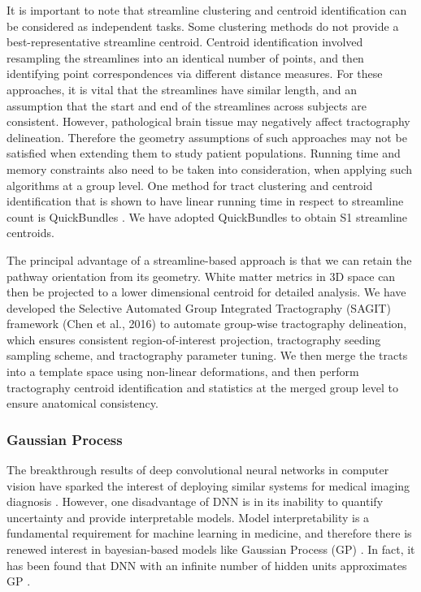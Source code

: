 It is important to note that streamline clustering and centroid identification can be considered as independent tasks. Some clustering methods do not provide a best-representative streamline centroid. Centroid identification involved resampling the streamlines into an identical number of points, and then identifying point correspondences via different distance measures. For these approaches, it is vital that the streamlines have similar length, and an assumption that the start and end of the streamlines across subjects are consistent. However, pathological brain tissue may negatively affect tractography delineation. Therefore the geometry assumptions of such approaches may not be satisfied when extending them to study patient populations. Running time and memory constraints also need to be taken into consideration, when applying such algorithms at a group level. One method for tract clustering and centroid identification that is shown to have linear running time in respect to streamline count is QuickBundles \cite{Garyfallidis2012}. We have adopted QuickBundles to obtain S1 streamline centroids. 

The principal advantage of a streamline-based approach is that we can retain the pathway orientation from its geometry. White matter metrics in 3D space can then be projected to a lower dimensional centroid for detailed analysis. We have developed the Selective Automated Group Integrated Tractography (SAGIT) framework (Chen et al., 2016) to automate group-wise tractography delineation, which ensures consistent region-of-interest projection, tractography seeding sampling scheme, and tractography parameter tuning. We then merge the tracts into a template space using non-linear deformations, and then perform tractography centroid identification and statistics at the merged group level to ensure anatomical consistency. 

\subsubsection{Gaussian Process}
The breakthrough results of deep convolutional neural networks in computer vision \cite{Krizhevsky2012} have sparked the interest of deploying similar systems for medical imaging diagnosis \cite{Greenspan2016}. However, one disadvantage of DNN is in its inability to quantify uncertainty and provide interpretable models. Model interpretability is a fundamental requirement for machine learning in medicine, and therefore there is renewed interest in bayesian-based models like Gaussian Process (GP) \cite{gal2016dropout}. In fact, it has been found that DNN with an infinite number of hidden units approximates GP \cite{neal1996priors}. 

